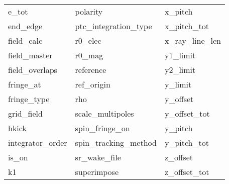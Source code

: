 \begin{tabular}{lll}
e_tot                       & polarity                    & x_pitch                     \\
end_edge                    & ptc_integration_type        & x_pitch_tot                 \\
field_calc                  & r0_elec                     & x_ray_line_len              \\
field_master                & r0_mag                      & y1_limit                    \\
field_overlaps              & reference                   & y2_limit                    \\
fringe_at                   & ref_origin                  & y_limit                     \\
fringe_type                 & rho                         & y_offset                    \\
grid_field                  & scale_multipoles            & y_offset_tot                \\
hkick                       & spin_fringe_on              & y_pitch                     \\
integrator_order            & spin_tracking_method        & y_pitch_tot                 \\
is_on                       & sr_wake_file                & z_offset                    \\
k1                          & superimpose                 & z_offset_tot                \\
 \bottomrule
 \end{tabular}
 \vfill
 
